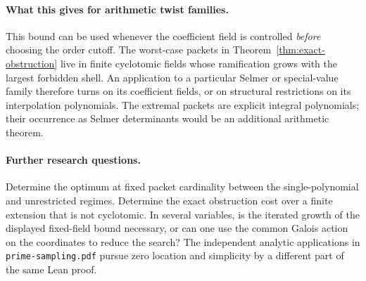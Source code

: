\paragraph{What this gives for arithmetic twist families.}
This bound can be used whenever the coefficient field is controlled \emph{before} choosing the order cutoff. The worst-case packets in Theorem~\ref{thm:exact-obstruction} live in finite cyclotomic fields whose ramification grows with the largest forbidden shell. An application to a particular Selmer or special-value family therefore turns on its coefficient fields, or on structural restrictions on its interpolation polynomials. The extremal packets are explicit integral polynomials; their occurrence as Selmer determinants would be an additional arithmetic theorem.

\paragraph{Further research questions.}
Determine the optimum at fixed packet cardinality between the single-polynomial and unrestricted regimes. Determine the exact obstruction cost over a finite extension that is not cyclotomic. In several variables, is the iterated growth of the displayed fixed-field bound necessary, or can one use the common Galois action on the coordinates to reduce the search? The independent analytic applications in \texttt{prime-sampling.pdf} pursue zero location and simplicity by a different part of the same Lean proof.
